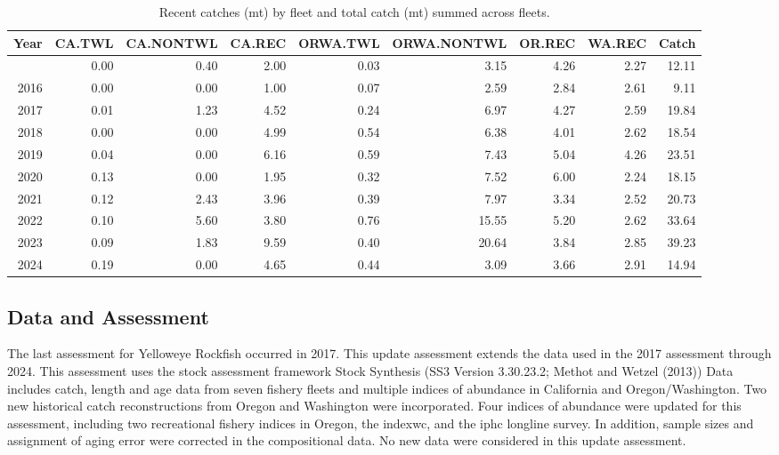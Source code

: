 \documentclass[
]{scrartcl}
\begin{document}
\begin{landscape}
\begingroup
\setlength{}
\setlength{}\fontsize{9.0pt}{10.8pt}\selectfont

\begin{longtable}{@{\extracolsep{\fill}}rrrrrrrrr}

\caption{\label{tbl-es-catches}Recent catches (mt) by fleet and total
catch (mt) summed across fleets.}

\tabularnewline

\toprule
Year & CA.TWL & CA.NONTWL & CA.REC & ORWA.TWL & ORWA.NONTWL & OR.REC & WA.REC & Catch \\ 
\midrule\addlinespace[2.5pt]
2015 & 0.00 & 0.40 & 2.00 & 0.03 & 3.15 & 4.26 & 2.27 & 12.11 \\ 
2016 & 0.00 & 0.00 & 1.00 & 0.07 & 2.59 & 2.84 & 2.61 & 9.11 \\ 
2017 & 0.01 & 1.23 & 4.52 & 0.24 & 6.97 & 4.27 & 2.59 & 19.84 \\ 
2018 & 0.00 & 0.00 & 4.99 & 0.54 & 6.38 & 4.01 & 2.62 & 18.54 \\ 
2019 & 0.04 & 0.00 & 6.16 & 0.59 & 7.43 & 5.04 & 4.26 & 23.51 \\ 
2020 & 0.13 & 0.00 & 1.95 & 0.32 & 7.52 & 6.00 & 2.24 & 18.15 \\ 
2021 & 0.12 & 2.43 & 3.96 & 0.39 & 7.97 & 3.34 & 2.52 & 20.73 \\ 
2022 & 0.10 & 5.60 & 3.80 & 0.76 & 15.55 & 5.20 & 2.62 & 33.64 \\ 
2023 & 0.09 & 1.83 & 9.59 & 0.40 & 20.64 & 3.84 & 2.85 & 39.23 \\ 
2024 & 0.19 & 0.00 & 4.65 & 0.44 & 3.09 & 3.66 & 2.91 & 14.94 \\ 
\bottomrule

\end{longtable}

\endgroup

\end{landscape}

\clearpage

\subsection*{Data and Assessment}\label{data-and-assessment}

The last assessment for Yelloweye Rockfish occurred in 2017. This update
assessment extends the data used in the 2017 assessment through 2024.
This assessment uses the stock assessment framework Stock Synthesis (SS3
Version 3.30.23.2; Methot and Wetzel (2013)) Data includes catch, length
and age data from seven fishery fleets and multiple indices of abundance
in California and Oregon/Washington. Two new historical catch
reconstructions from Oregon and Washington were incorporated. Four
indices of abundance were updated for this assessment, including two
recreational fishery indices in Oregon, the \gls{indexwc}, and the
\gls{iphc} longline survey. In addition, sample sizes and assignment of
aging error were corrected in the compositional data. No new data were
considered in this update assessment.
\end{document}
